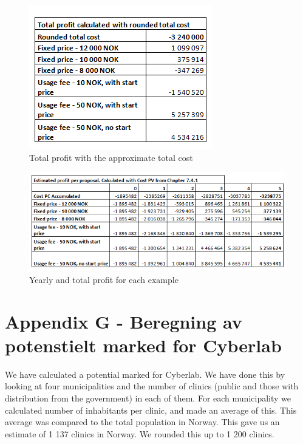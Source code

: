 \begin{figure}
\begin{center}
\includegraphics[scale=0.8]{revenuepvappendixprofitrounded}
\caption{Total profit with the approximate total cost}
\label{fig:profitRounded}
\end{center}
\end{figure}

\begin{figure}
\begin{center}
\includegraphics[scale=0.8]{revenuepvappendixprofit}
\caption{Yearly and total profit for each example}
\label{fig:profitAll}
\end{center}
\end{figure}

\newpage
\section*{Appendix G - Beregning av potenstielt marked for Cyberlab}
\label{G}

We have calculated a potential marked for Cyberlab. We have done this by looking at four municipalities and the number of clinics (public and those with distribution from the government) in each of them. For each municipality we calculated number of inhabitants per clinic, and made an average of this. This average was compared to the total population in Norway. This gave us an estimate of 1 137 clinics in Norway. We rounded this up to 1 200 clinics.

